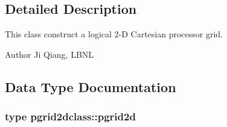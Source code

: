 \subsection{Detailed Description}
This class construct a logical 2-\/D Cartesian processor grid. 

\begin{DoxyAuthor}{Author}
Ji Qiang, L\+B\+NL 
\end{DoxyAuthor}


\subsection{Data Type Documentation}
\label{structpgrid2dclass_1_1pgrid2d}
\subsubsection{type pgrid2dclass\+::pgrid2d}
